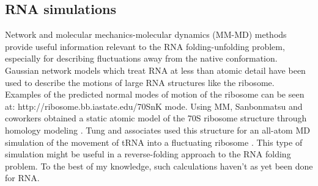 \subsection{RNA simulations}
Network and molecular mechanics-molecular dynamics (MM-MD) methods
provide useful information relevant to the RNA folding-unfolding
problem, especially for describing fluctuations away from the native
conformation. Gaussian network models \cite{y_wang2004, bahar1998,
wang2005} which treat RNA at less than atomic detail have been used
to describe the motions of large RNA structures like the ribosome.
Examples of the predicted normal modes of motion of the ribosome can
be seen at: http://ribosome.bb.iastate.edu/70SnK mode. Using MM,
Sanbonmatsu and coworkers obtained a static atomic model of the 70S
ribosome structure through homology modeling \cite{tung2004}. Tung and
associates used this structure for an all-atom MD simulation of the
movement of tRNA into a fluctuating ribosome \cite{sanbonmatsu2005}.
This type of simulation might be useful in a reverse-folding
approach to the RNA folding problem. To the best of my knowledge,
such calculations haven't as yet been done for RNA.

